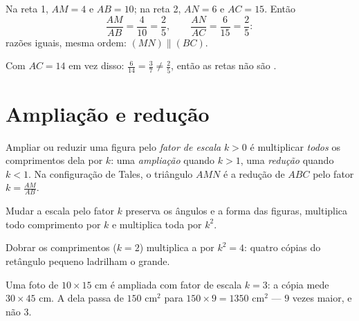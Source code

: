 \begin{example}\label{ex:g9:thales:converse}
Na reta 1, $AM = 4$ e $AB = 10$; na reta 2, $AN = 6$ e $AC = 15$.
Então
\[
\frac{AM}{AB} = \frac{4}{10} = \frac25,
\qquad
\frac{AN}{AC} = \frac{6}{15} = \frac25 :
\]
razões iguais, mesma ordem: $(MN) \parallel (BC)$.

Com $AC = 14$ em vez disso: $\frac{6}{14} = \frac37 \neq \frac25$,
então as retas não são .
\end{example}

\section{Ampliação e redução}

\begin{definition}\label{def:g9:thales:scaling}
Ampliar ou reduzir uma figura pelo \emph{fator de escala} $k > 0$ é multiplicar \emph{todos} os comprimentos dela por
$k$: uma \emph{ampliação} quando $k > 1$, uma \emph{redução} quando
$k < 1$. Na configuração de Tales, o triângulo $AMN$ é a redução de
$ABC$ pelo fator $k = \frac{AM}{AB}$.
\end{definition}

\begin{proposition}\label{prop:g9:thales:scaling}
Mudar a escala pelo fator $k$ preserva os ângulos e a forma das
figuras, multiplica todo comprimento por $k$ e multiplica toda
\emph{} por $k^2$.
\end{proposition}
\admitted

\begin{omfigure}

{\small Dobrar os comprimentos ($k = 2$) multiplica a  por
$k^2 = 4$: quatro cópias do retângulo pequeno ladrilham o grande.}
\end{omfigure}

\begin{example}
Uma foto de $10 \times 15$ cm é ampliada com fator de escala $k = 3$: a
cópia mede $30 \times 45$ cm. A  dela passa de $150$ cm$^2$ para
$150 \times 9 = 1350$ cm$^2$ --- $9$ vezes maior, e não $3$.
\end{example}

